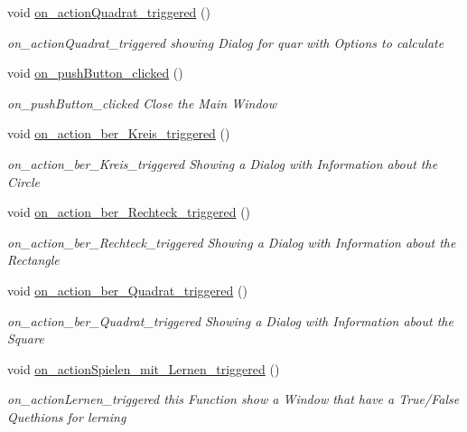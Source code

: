 \begin{DoxyCompactItemize}
void \mbox{\hyperlink{class_main_window_a9f891fe4873bb00a7cb186f6d9acb9fe}{on\+\_\+action\+Quadrat\+\_\+triggered}} ()
\begin{DoxyCompactList}\small\item\em on\+\_\+action\+Quadrat\+\_\+triggered showing Dialog for quar with Options to calculate \end{DoxyCompactList}\item 
void \mbox{\hyperlink{class_main_window_a4de79c63c7fa0b8d7c468ac71f20be81}{on\+\_\+push\+Button\+\_\+clicked}} ()
\begin{DoxyCompactList}\small\item\em on\+\_\+push\+Button\+\_\+clicked Close the Main Window \end{DoxyCompactList}\item 
void \mbox{\hyperlink{class_main_window_aa46814868d73e0a0e163c2d4ee855f76}{on\+\_\+action\+\_\+ber\+\_\+\+Kreis\+\_\+triggered}} ()
\begin{DoxyCompactList}\small\item\em on\+\_\+action\+\_\+ber\+\_\+\+Kreis\+\_\+triggered Showing a Dialog with Information about the Circle \end{DoxyCompactList}\item 
void \mbox{\hyperlink{class_main_window_a8581f17d3139d11adedbc775cb17c453}{on\+\_\+action\+\_\+ber\+\_\+\+Rechteck\+\_\+triggered}} ()
\begin{DoxyCompactList}\small\item\em on\+\_\+action\+\_\+ber\+\_\+\+Rechteck\+\_\+triggered Showing a Dialog with Information about the Rectangle \end{DoxyCompactList}\item 
void \mbox{\hyperlink{class_main_window_aae8a9cc8485e71157bc123455a5e4ceb}{on\+\_\+action\+\_\+ber\+\_\+\+Quadrat\+\_\+triggered}} ()
\begin{DoxyCompactList}\small\item\em on\+\_\+action\+\_\+ber\+\_\+\+Quadrat\+\_\+triggered Showing a Dialog with Information about the Square \end{DoxyCompactList}\item 
void \mbox{\hyperlink{class_main_window_aa268869cf5d64f54ee51f41c19a0ee4a}{on\+\_\+action\+Spielen\+\_\+mit\+\_\+\+Lernen\+\_\+triggered}} ()
\begin{DoxyCompactList}\small\item\em on\+\_\+action\+Lernen\+\_\+triggered this Function show a Window that have a True/\+False Quethions for lerning \end{DoxyCompactList}\item 

\end{DoxyCompactItemize}
